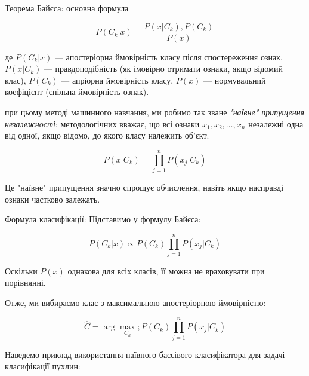 Теорема Байєса: основна формула

$$P(C_k | x) = \frac{P(x | C_k) , P(C_k)}{P(x)}$$

де $P(C_k | x)$ — апостеріорна ймовірність класу після спостереження ознак, $P(x | C_k)$ — правдоподібність (як імовірно отримати ознаки, якщо відомий клас), $P(C_k)$ — апріорна ймовірність класу, $P(x)$ — нормувальний коефіцієнт (спільна ймовірність ознак).

при цьому методі машинного навчання, ми робимо так зване \textit{"наївне" припущення незалежності}: методологічних вважає, що всі ознаки $x_1, x_2, \dots, x_n$ незалежні одна від одної, якщо відомо, до якого класу належить об’єкт.

$$P(x | C_k) = \prod_{j=1}^n P(x_j | C_k)$$

Це "наївне" припущення значно спрощує обчислення, навіть якщо насправді ознаки частково залежать.

Формула класифікації: Підставимо у формулу Байєса:

$$P(C_k | x) \propto P(C_k) \prod_{j=1}^n P(x_j | C_k)$$

Оскільки $ P(x) $ однакова для всіх класів, її можна не враховувати при порівнянні.

Отже, ми вибираємо клас з максимальною апостеріорною ймовірністю:

$$\hat{C} = \arg\max_{C_k} ; P(C_k) \prod_{j=1}^n P(x_j | C_k)$$

Наведемо приклад використання наївного баєсівого класифікатора для задачі класифікації пухлин:

